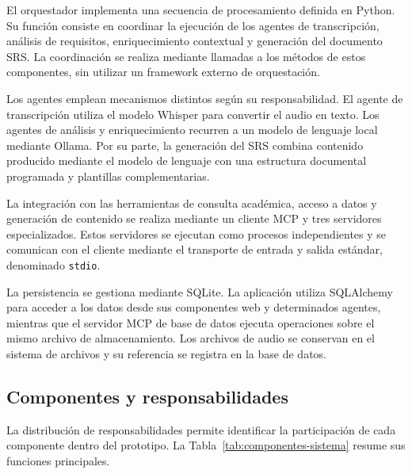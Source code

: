 El orquestador implementa una secuencia de procesamiento definida
en Python. Su función consiste en coordinar la ejecución de los
agentes de transcripción, análisis de requisitos, enriquecimiento
contextual y generación del documento SRS. La coordinación se
realiza mediante llamadas a los métodos de estos componentes,
sin utilizar un framework externo de orquestación.

Los agentes emplean mecanismos distintos según su responsabilidad.
El agente de transcripción utiliza el modelo Whisper para convertir
el audio en texto. Los agentes de análisis y enriquecimiento
recurren a un modelo de lenguaje local mediante Ollama. Por su
parte, la generación del SRS combina contenido producido mediante
el modelo de lenguaje con una estructura documental programada
y plantillas complementarias.

La integración con las herramientas de consulta académica,
acceso a datos y generación de contenido se realiza mediante
un cliente MCP y tres servidores especializados. Estos servidores
se ejecutan como procesos independientes y se comunican con
el cliente mediante el transporte de entrada y salida estándar,
denominado \texttt{stdio}.

La persistencia se gestiona mediante SQLite. La aplicación utiliza
SQLAlchemy para acceder a los datos desde sus componentes web
y determinados agentes, mientras que el servidor MCP de base
de datos ejecuta operaciones sobre el mismo archivo de
almacenamiento. Los archivos de audio se conservan en el sistema
de archivos y su referencia se registra en la base de datos.

\subsection{Componentes y responsabilidades}

La distribución de responsabilidades permite identificar la
participación de cada componente dentro del prototipo.
La Tabla~\ref{tab:componentes-sistema} resume sus funciones
principales.

